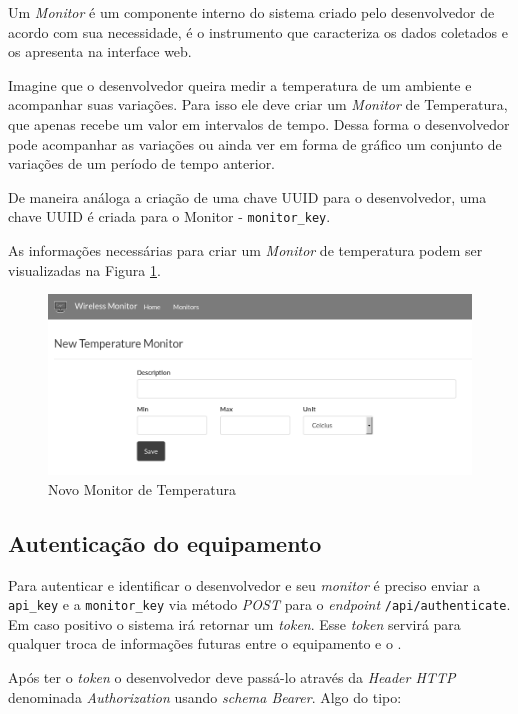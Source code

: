 Um \emph{Monitor} é um componente interno do sistema criado pelo
desenvolvedor de acordo com sua necessidade, é o instrumento que
caracteriza os dados coletados e os apresenta na interface web.

Imagine que o desenvolvedor queira medir a temperatura de um ambiente e
acompanhar suas variações. Para isso ele deve criar um \emph{Monitor} de
Temperatura, que apenas recebe um valor em intervalos de tempo. Dessa
forma o desenvolvedor pode acompanhar as variações ou ainda ver em forma
de gráfico um conjunto de variações de um período de tempo anterior.

De maneira análoga a criação de uma chave UUID para o desenvolvedor, uma
chave UUID é criada para o Monitor - \texttt{monitor\_key}.

As informações necessárias para criar um \emph{Monitor} de temperatura
podem ser visualizadas na Figura \ref{fig:new-temperature-monitor}.

\begin{figure}[h]
    \centering
    \includegraphics[scale=0.4]{img/new-temperature-monitor-grey.png}
    \caption{Novo Monitor de Temperatura} \label{fig:new-temperature-monitor}
\end{figure}

\subsection{Autenticação do
equipamento}\label{autenticauxe7uxe3o-do-equipamento}

Para autenticar e identificar o desenvolvedor e seu \emph{monitor} é
preciso enviar a \texttt{api\_key} e a \texttt{monitor\_key} via método
\emph{POST} para o \emph{endpoint} \texttt{/api/authenticate}. Em caso
positivo o sistema irá retornar um \emph{token}. Esse \emph{token}
servirá para qualquer troca de informações futuras entre o equipamento
\iot e o \wm.

Após ter o \emph{token} o desenvolvedor deve passá-lo através da
\emph{Header HTTP} denominada \emph{Authorization} usando \emph{schema
Bearer}. Algo do tipo:

